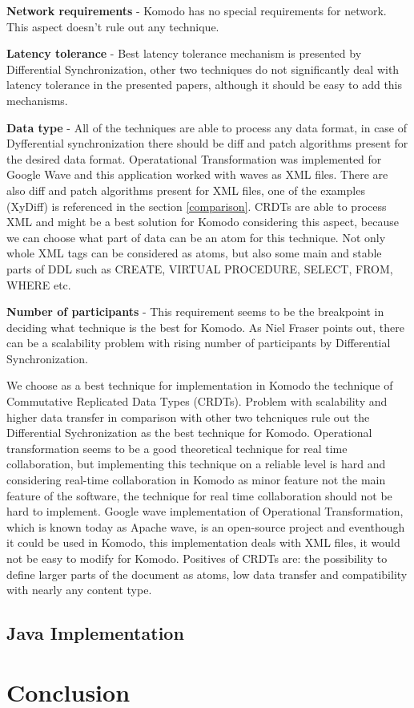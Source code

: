 \documentclass[12pt,oneside]{fithesis2}
\begin{document}
\vspace{3mm} 

\textbf{Network requirements} - Komodo has no special requirements for network. This aspect doesn't rule out any technique.

\vspace{3mm} 

\textbf{Latency tolerance} - Best latency tolerance mechanism is presented by Differential Synchronization, other two techniques do not significantly deal with latency tolerance in the presented papers, although it should be easy to add this mechanisms.

\vspace{3mm} 

\textbf{Data type} - All of the techniques are able to process any data format, in case of Dyfferential synchronization there should be diff and patch algorithms present for the desired data format. Operatational Transformation was implemented for Google Wave and this application worked with waves as XML files. There are also diff and patch algorithms present for XML files, one of the examples (XyDiff) is referenced in the section \ref{comparison}. CRDTs are able to process XML and might be a best solution for Komodo considering this aspect, because we can choose what part of data can be an atom for this technique. Not only whole XML tags can be considered as atoms, but also some main and stable parts of DDL such as CREATE, VIRTUAL PROCEDURE, SELECT, FROM, WHERE etc.

\vspace{3mm} 

\textbf{Number of participants} - This requirement seems to be the breakpoint in deciding what technique is the best for Komodo. As Niel Fraser \cite{Fraser} points out, there can be a scalability problem with rising number of participants by Differential Synchronization.

\vspace{3mm} 

We choose as a best technique for implementation in Komodo the technique of Commutative Replicated Data Types (CRDTs). Problem with scalability and higher data transfer in comparison with other two tehcniques rule out the Differential Sychronization as the best technique for Komodo. Operational transformation seems to be a good theoretical technique for real time collaboration, but implementing this technique on a reliable level is hard and considering real-time collaboration in Komodo as minor feature not the main feature of the software, the technique for real time collaboration should not be hard to implement. Google wave implementation of Operational Transformation, which is known today as Apache wave, is an open-source project and eventhough it could be used in Komodo, this implementation deals with XML files, it would not be easy to modify for Komodo. Positives of CRDTs are: the possibility to define larger parts of the document as atoms, low data transfer and compatibility with nearly any content type. 

\section{Java Implementation}
\chapter{Conclusion}
 
 
\end{document}

